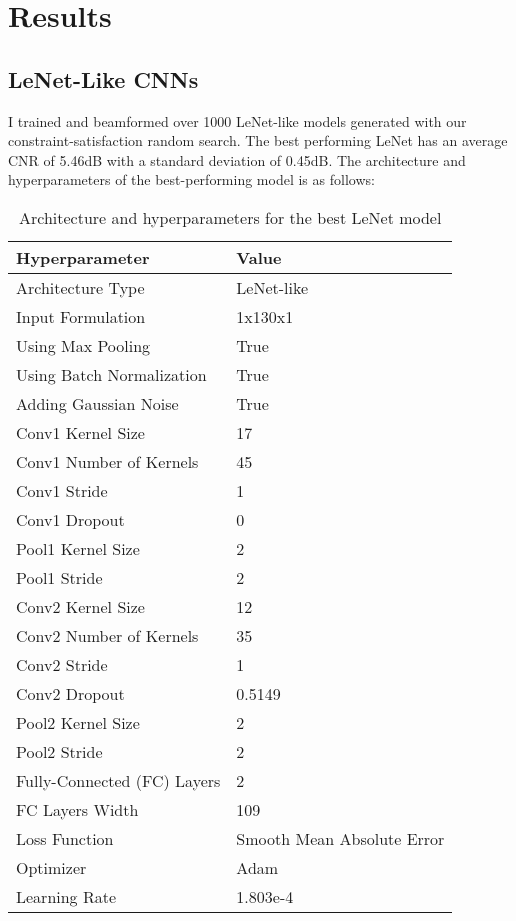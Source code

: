 \chapter{Results}

\section{LeNet-Like CNNs}

  I trained and beamformed over 1000 LeNet-like models generated with our constraint-satisfaction random search. The best performing LeNet has an average CNR of 5.46dB with a standard deviation of 0.45dB. The architecture and hyperparameters of the best-performing model is as follows:

\begin{table}[]
\vspace*{5mm}
\centering
\renewcommand\arraystretch{0.9}
\begin{tabular}{@{}ll@{}}
Hyperparameter & Value \\ \midrule
Architecture Type & LeNet-like \\
Input Formulation & 1x130x1 \\
Using Max Pooling & True \\
Using Batch Normalization & True \\
Adding Gaussian Noise & True \\
Conv1 Kernel Size & 17 \\
Conv1 Number of Kernels & 45 \\
Conv1 Stride & 1 \\
Conv1 Dropout & 0 \\
Pool1 Kernel Size & 2 \\
Pool1 Stride & 2 \\
Conv2 Kernel Size & 12 \\
Conv2 Number of Kernels & 35 \\
Conv2 Stride & 1 \\
Conv2 Dropout & 0.5149 \\
Pool2 Kernel Size & 2 \\
Pool2 Stride & 2 \\
Fully-Connected (FC) Layers & 2 \\
FC Layers Width & 109 \\
Loss Function & Smooth Mean Absolute Error \\
Optimizer & Adam \\
Learning Rate & 1.803e-4 \\ \bottomrule
\end{tabular}
\vspace{0.5mm}
\caption{Architecture and hyperparameters for the best LeNet model}
\end{table}


